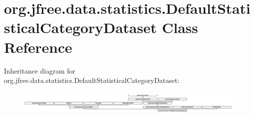 \hypertarget{classorg_1_1jfree_1_1data_1_1statistics_1_1_default_statistical_category_dataset}{}\section{org.\+jfree.\+data.\+statistics.\+Default\+Statistical\+Category\+Dataset Class Reference}
\label{classorg_1_1jfree_1_1data_1_1statistics_1_1_default_statistical_category_dataset}
Inheritance diagram for org.\+jfree.\+data.\+statistics.\+Default\+Statistical\+Category\+Dataset\+:\begin{figure}[H]
\begin{center}
\leavevmode
\includegraphics[height=1.179941cm]{classorg_1_1jfree_1_1data_1_1statistics_1_1_default_statistical_category_dataset}
\end{center}
\end{figure}
